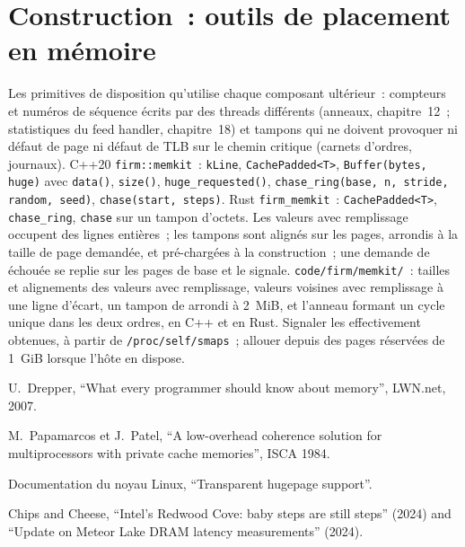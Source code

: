 \section{Construction~: outils de placement en mémoire}\label{bld:ll:memory-hierarchy-and-caches:memkit}

\begin{build}
 Les primitives de disposition qu'utilise chaque composant ultérieur~: compteurs et numéros de séquence écrits par des threads différents
(anneaux, chapitre~12~; statistiques du feed handler, chapitre~18) et tampons qui ne doivent provoquer ni défaut de page ni défaut de TLB
sur le chemin critique (carnets d'ordres, journaux).
 C++20 \texttt{firm::memkit}~: \texttt{kLine}, \texttt{CachePadded<T>},
\texttt{Buffer(bytes, huge)} avec \texttt{data()}, \texttt{size()}, \texttt{huge\_requested()},
\texttt{chase\_ring(base, n, stride, random, seed)}, \texttt{chase(start, steps)}. Rust \texttt{firm\_memkit}~: \texttt{CachePadded<T>}, \texttt{chase\_ring},
\texttt{chase} sur un tampon d'octets.
 Les valeurs avec remplissage occupent des lignes entières~; les tampons sont alignés sur les pages, arrondis à la taille de page demandée, et
pré-chargées à la construction~; une demande de  échouée se replie sur les pages de base et le signale.
 \texttt{code/firm/memkit/}~: tailles et alignements des valeurs avec remplissage, valeurs voisines avec
remplissage à une ligne d'écart, un tampon de  arrondi à 2~MiB, et l'anneau formant un cycle unique dans les deux ordres, en C++ et en Rust.
 Signaler les  effectivement obtenues, à partir de \texttt{/proc/self/smaps}~; allouer depuis des pages réservées de 1~GiB
lorsque l'hôte en dispose.
\end{build}

\begin{omsources}
\item U.~Drepper, ``What every programmer should know about memory'', LWN.net, 2007.
\item M.~Papamarcos et J.~Patel, ``A low-overhead coherence solution for multiprocessors with private cache memories'',
ISCA 1984.
\item Documentation du noyau Linux, ``Transparent hugepage support''.
\item Chips and Cheese, ``Intel's Redwood Cove: baby steps are still steps'' (2024) and ``Update on Meteor Lake DRAM
latency measurements'' (2024).
\end{omsources}

